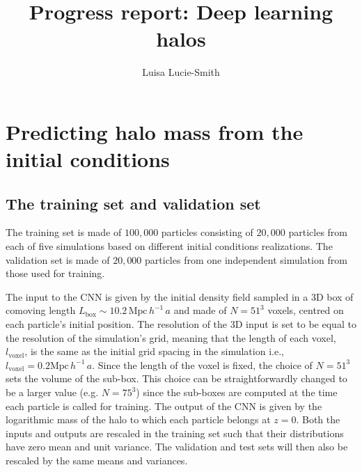 \documentclass[11pt]{article}
\title{Progress report: Deep learning halos}
\author{Luisa Lucie-Smith}
\begin{document}
\maketitle

\section{Predicting halo mass from the initial conditions}

\subsection{The training set and validation set}

The training set is made of $100,000$ particles consisting of $20,000$ particles from each of five simulations based on different initial conditions realizations. The validation set is made of $20,000$ particles from one independent simulation from those used for training.

The input to the CNN is given by the initial density field sampled in a 3D box of comoving length $L_\mathrm{box} \sim 10.2 \, \mathrm{Mpc} \, h^{-1} \, a$ and made of $N = 51^{3}$ voxels, centred on each particle's initial position. The resolution of the 3D input is set to be equal to the resolution of the simulation's grid, meaning that the length of each voxel, $l_\mathrm{voxel}$, is the same as the initial grid spacing in the simulation i.e., $l_\mathrm{voxel} = 0.2 \mathrm{Mpc} \, h^{-1} \, a$. Since the length of the voxel is fixed, the choice of $N =51^3$ sets the volume of the sub-box. This choice can be straightforwardly changed to be a larger value (e.g. $N =75^3$) since the sub-boxes are computed at the time each particle is called for training. The output of the CNN is given by the logarithmic mass of the halo to which each particle belongs at $z=0$. Both the inputs and outputs are rescaled in the training set such that their distributions have zero mean and unit variance. The validation and test sets will then also be rescaled by the same means and variances.
\end{document}
